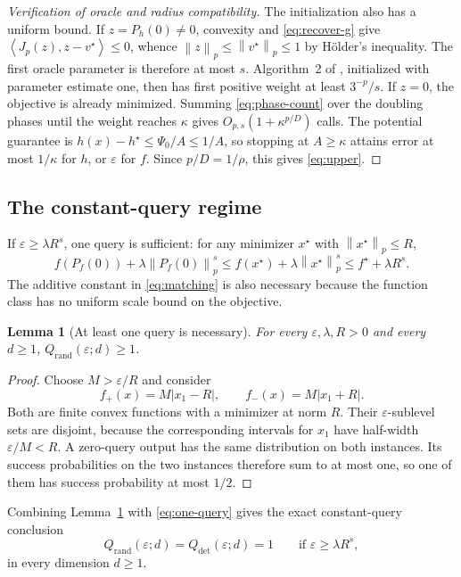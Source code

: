 \documentclass[11pt]{article}
\newtheorem{lemma}[theorem]{Lemma}
\theoremstyle{definition}
\theoremstyle{remark}
\newcommand{\eps}{\varepsilon}
\newcommand{\norm}[1]{\left\lVert#1\right\rVert}
\newcommand{\ip}[2]{\left\langle#1,#2\right\rangle}
\newcommand{\Qrand}{Q_{\mathrm{rand}}}
\newcommand{\Qdet}{Q_{\mathrm{det}}}
\begin{document}
\begin{proof}[Verification of oracle and radius compatibility]
The initialization also has a uniform bound. If $z=P_h(0)\ne0$,
convexity and \eqref{eq:recover-g} give
$\ip{J_p(z)}{z-v^\star}\le0$, whence
$\norm{z}_p\le\norm{v^\star}_p\le1$ by H\"older's inequality.
The first oracle parameter is therefore at most $s$.
Algorithm~2 of \citet{ABJS}, initialized with parameter estimate one,
then has first positive weight at least $3^{-p}/s$.
If $z=0$, the objective is already minimized.
Summing \eqref{eq:phase-count} over the doubling phases until the
weight reaches $\kappa$ gives
$O_{p,s}(1+\kappa^{p/D})$ calls. The potential guarantee is
$h(x)-h^\star\le\Psi_0/A\le1/A$, so stopping at $A\ge\kappa$
attains error at most $1/\kappa$ for $h$, or $\eps$ for $f$.
Since $p/D=1/\rho$, this gives \eqref{eq:upper}.
\end{proof}

\subsection{The constant-query regime}

If $\eps\ge\lambda R^s$, one query is sufficient: for any minimizer
$x^\star$ with $\norm{x^\star}_p\le R$,
\begin{equation}\label{eq:one-query}
f(P_f(0))+\lambda\norm{P_f(0)}_p^s
\le f(x^\star)+\lambda\norm{x^\star}_p^s
\le f^\star+\lambda R^s.
\end{equation}
The additive constant in \eqref{eq:matching} is also necessary because
the function class has no uniform scale bound on the objective.

\begin{lemma}[At least one query is necessary]\label{lem:zero}
For every $\eps,\lambda,R>0$ and every $d\ge1$,
$\Qrand(\eps;d)\ge1$.
\end{lemma}

\begin{proof}
Choose $M>\eps/R$ and consider
\[
f_+(x)=M|x_1-R|,
\qquad f_-(x)=M|x_1+R|.
\]
Both are finite convex functions with a minimizer at norm $R$. Their
$\eps$-sublevel sets are disjoint, because the corresponding intervals for
$x_1$ have half-width $\eps/M<R$. A zero-query output has the same
distribution on both instances. Its success probabilities on the two
instances therefore sum to at most one, so one of them has success probability
at most $1/2$.
\end{proof}

Combining Lemma~\ref{lem:zero} with \eqref{eq:one-query} gives the exact
constant-query conclusion
\[
\Qrand(\eps;d)=\Qdet(\eps;d)=1
\qquad\text{if }\eps\ge\lambda R^s,
\]
in every dimension $d\ge1$.
\end{document}
